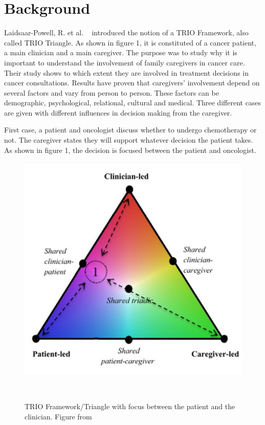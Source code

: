 \documentclass{sigchi}
\begin{document}
\section{Background}
Laidsaar-Powell, R. et al. ~\cite{Laidsaar-Powell2017} introduced the notion of a TRIO Framework, also called TRIO Triangle. As shown in figure 1, it is constituted of a cancer patient, a main clinician and a main caregiver. The purpose was to study why it is important to understand the  involvement of family caregivers in cancer care. Their study shows to which extent they are involved in treatment decisions in cancer consultations. Results have proven that caregivers’ involvement depend on several factors and vary from person to person. These factors can be demographic, psychological, relational, cultural and medical. Three different cases are given with different influences in decision making from the caregiver.

First case, a patient and oncologist discuss whether to undergo chemotherapy or not. The caregiver states they will support whatever decision the patient takes. As shown in figure 1, the decision is focused between the patient and oncologist.

\begin{figure}[H]
\centering
  \includegraphics[width=0.9\columnwidth]{figures/Triangle1Screenshot.jpg}
  \caption{TRIO Framework/Triangle with focus between the patient and the clinician. Figure from}~\label{fig:figure1}
\end{figure}
\end{document}
